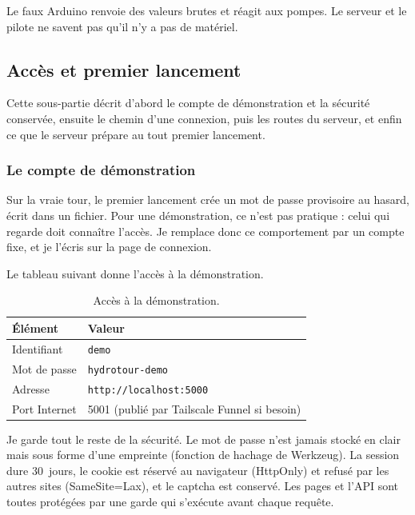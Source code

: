 \begin{aretenir}
Le faux Arduino renvoie des valeurs brutes et réagit aux pompes. Le serveur et le pilote ne savent pas qu'il n'y a pas de matériel.
\end{aretenir}

\subsection{Accès et premier lancement}

Cette sous-partie décrit d'abord le compte de démonstration et la sécurité conservée, ensuite le chemin d'une connexion, puis les routes du serveur, et enfin ce que le serveur prépare au tout premier lancement.

\subsubsection*{Le compte de démonstration}

Sur la vraie tour, le premier lancement crée un mot de passe provisoire au hasard, écrit dans un fichier. Pour une démonstration, ce n'est pas pratique : celui qui regarde doit connaître l'accès. Je remplace donc ce comportement par un compte fixe, et je l'écris sur la page de connexion.

Le tableau suivant donne l'accès à la démonstration.

\begin{table}[H]
\centering
\small
\begin{tabularx}{0.8\textwidth}{|l|Y|}
\hline
\textbf{Élément} & \textbf{Valeur} \\
\hline
Identifiant & \texttt{demo} \\
\hline
Mot de passe & \texttt{hydrotour-demo} \\
\hline
Adresse & \texttt{http://localhost:5000} \\
\hline
Port Internet & 5001 (publié par Tailscale Funnel si besoin) \\
\hline
\end{tabularx}
\caption{Accès à la démonstration.}
\end{table}

Je garde tout le reste de la sécurité. Le mot de passe n'est jamais stocké en clair mais sous forme d'une empreinte (fonction de hachage de Werkzeug). La session dure \qty{30}{jours}, le cookie est réservé au navigateur (HttpOnly) et refusé par les autres sites (SameSite=Lax), et le captcha est conservé. Les pages et l'API sont toutes protégées par une garde qui s'exécute avant chaque requête.

